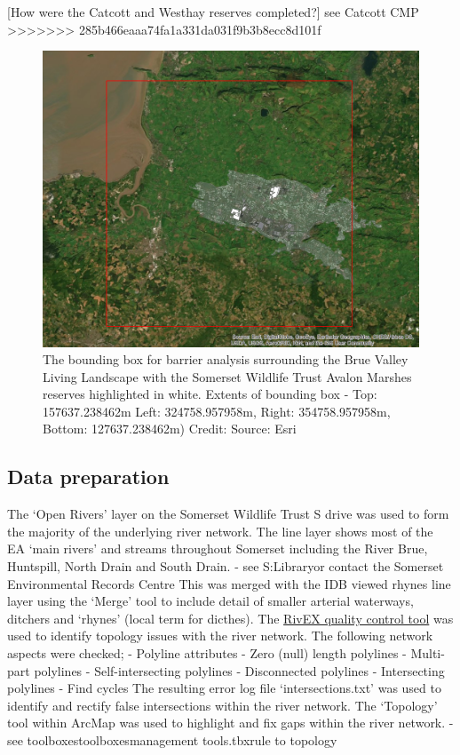 \documentclass[]{article}
\begin{document}
{[}How were the Catcott and Westhay reserves completed?{]} see Catcott
CMP
\textgreater{}\textgreater{}\textgreater{}\textgreater{}\textgreater{}\textgreater{}\textgreater{}
285b466eaaa74fa1a331da031f9b3b8ecc8d101f

\begin{figure}
\centering
\includegraphics{WetHabitats_BoundingBoxLQ.jpg}
\caption{The bounding box for barrier analysis surrounding the Brue
Valley Living Landscape with the Somerset Wildlife Trust Avalon Marshes
reserves highlighted in white. Extents of bounding box - Top:
157637.238462m Left: 324758.957958m, Right: 354758.957958m, Bottom:
127637.238462m) Credit: Source: Esri}
\end{figure}

\hypertarget{data-preparation}{%
\subsection{Data preparation}\label{data-preparation}}

The `Open Rivers' layer on the Somerset Wildlife Trust S drive was used
to form the majority of the underlying river network. The line layer
shows most of the EA `main rivers' and streams throughout Somerset
including the River Brue, Huntspill, North Drain and South Drain. - see
S:\GIS\Layer Library\Environmental or contact the Somerset Environmental
Records Centre This was merged with the IDB viewed rhynes line layer
using the `Merge' tool to include detail of smaller arterial waterways,
ditchers and `rhynes' (local term for dicthes). The
\href{http://www.rivex.co.uk/Online-Manual/Qualitycontrolyourrivernetwork.html}{RivEX
quality control tool} was used to identify topology issues with the
river network. The following network aspects were checked; - Polyline
attributes - Zero (null) length polylines - Multi-part polylines -
Self-intersecting polylines - Disconnected polylines - Intersecting
polylines - Find cycles The resulting error log file `intersections.txt'
was used to identify and rectify false intersections within the river
network. The `Topology' tool within ArcMap was used to highlight and fix
gaps within the river network. - see
toolboxes\system toolboxes\data management tools.tbx\topology\add rule
to topology
\end{document}
